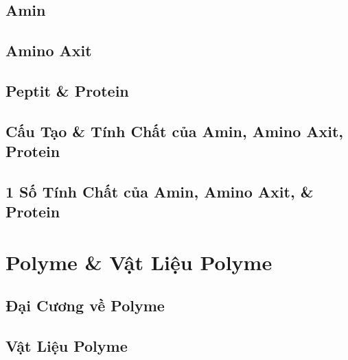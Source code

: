 \documentclass{article}
\numberwithin{equation}{section}
\begin{document}
\subsection{Amin}


\subsection{Amino Axit}


\subsection{Peptit \& Protein}


\subsection{Cấu Tạo \& Tính Chất của Amin, Amino Axit, Protein}


\subsection{1 Số Tính Chất của Amin, Amino Axit, \& Protein}


\section{Polyme \& Vật Liệu Polyme}

\subsection{Đại Cương về Polyme}


\subsection{Vật Liệu Polyme}
\end{document}
